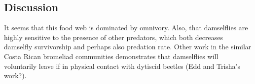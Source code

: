 \documentclass[10pt]{article}
\begin{document}
\begin{spacing}{2}
\section{Discussion}

It seems that this food web is dominated by omnivory.  Also, that
damselflies are highly sensitive to the presence of other predators,
which both decreases damselfly survivorship and perhaps also predation
rate.  Other work in the similar Costa Rican bromeliad communities
demonstrates that damselflies will voluntarily leave if in physical
contact with dytiscid beetles (Edd and Trisha's work?).

\end{spacing}

 

\end{document}
